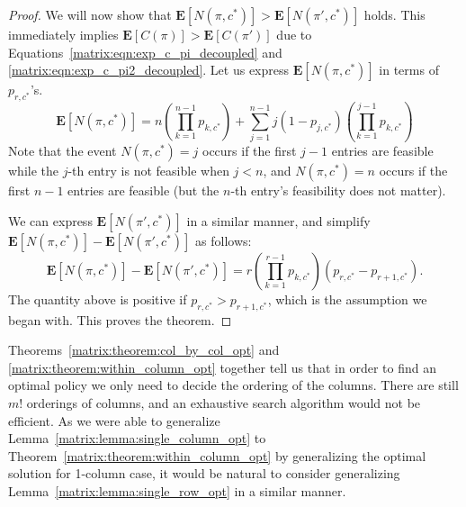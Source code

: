\begin{proof}
 	We will now show that $\mathbf{E}[N(\pi, c^*)] > \mathbf{E}[N(\pi', c^*)]$ holds. 
 	This immediately implies $\mathbf{E}[C(\pi)] > \mathbf{E}[C(\pi')]$ due to Equations~\ref{matrix:eqn:exp_c_pi_decoupled} and \ref{matrix:eqn:exp_c_pi2_decoupled}.
 	Let us express $\mathbf{E}[N(\pi, c^*)]$ in terms of $p_{r,c^*}$'s.
 	\begin{equation*}
 		\mathbf{E}[N(\pi, c^*)] = n\left( \prod_{k=1}^{n-1} p_{k,c^*}\right) + 
 		\sum_{j=1}^{n-1} j (1-p_{j,c^*}) \left( \prod_{k=1}^{j-1} p_{k,c^*} \right)
 	\end{equation*}
 	Note that the event $N(\pi, c^*) = j$ occurs if the first $j-1$ entries are feasible while the $j$-th entry is not feasible when $j < n$, and $N(\pi, c^*) = n$ occurs if the first $n-1$ entries are feasible (but the $n$-th entry's feasibility does not matter).
	
 	We can express $\mathbf{E}[N(\pi', c^*)]$ in a similar manner, and simplify  $\mathbf{E}[N(\pi, c^*)] - \mathbf{E}[N(\pi', c^*)]$ as follows:
 	\small
 	\begin{equation*}
 		\mathbf{E}[N(\pi, c^*)] - \mathbf{E}[N(\pi', c^*)] = 
 		r \left( \prod_{k=1}^{r-1} p_{k,c^*} \right) (p_{r,c^*} - p_{r+1,c^*}).
 	\end{equation*}
 	\normalsize
 	The quantity above is positive if $p_{r,c^*} > p_{r+1,c^*}$, which is the assumption we began with.
 	This proves the theorem.
 \end{proof}


 Theorems~\ref{matrix:theorem:col_by_col_opt} and \ref{matrix:theorem:within_column_opt} together tell us that 
 in order to find an optimal policy we only need to decide the ordering of the columns. 
 There are still $m!$ orderings of columns, and an exhaustive search algorithm would not be efficient.
 As we were able to generalize Lemma~\ref{matrix:lemma:single_column_opt} to Theorem~\ref{matrix:theorem:within_column_opt} by generalizing the optimal solution for 1-column case, it would be natural to consider generalizing Lemma~\ref{matrix:lemma:single_row_opt} in a similar manner.

